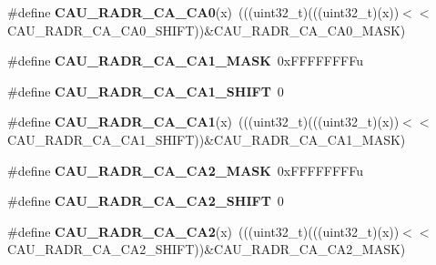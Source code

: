 \begin{DoxyCompactItemize}
\item 
\#define {\bfseries C\+A\+U\+\_\+\+R\+A\+D\+R\+\_\+\+C\+A\+\_\+\+C\+A0}(x)~(((uint32\+\_\+t)(((uint32\+\_\+t)(x))$<$$<$C\+A\+U\+\_\+\+R\+A\+D\+R\+\_\+\+C\+A\+\_\+\+C\+A0\+\_\+\+S\+H\+I\+FT))\&C\+A\+U\+\_\+\+R\+A\+D\+R\+\_\+\+C\+A\+\_\+\+C\+A0\+\_\+\+M\+A\+SK)\hypertarget{group__CAU__Register__Masks_gaf2bb47dc97be73cd0c2862fe138900ec}{}\label{group__CAU__Register__Masks_gaf2bb47dc97be73cd0c2862fe138900ec}

\item 
\#define {\bfseries C\+A\+U\+\_\+\+R\+A\+D\+R\+\_\+\+C\+A\+\_\+\+C\+A1\+\_\+\+M\+A\+SK}~0x\+F\+F\+F\+F\+F\+F\+F\+Fu\hypertarget{group__CAU__Register__Masks_ga7d2e754db6dd6dae2933a852f15a6f60}{}\label{group__CAU__Register__Masks_ga7d2e754db6dd6dae2933a852f15a6f60}

\item 
\#define {\bfseries C\+A\+U\+\_\+\+R\+A\+D\+R\+\_\+\+C\+A\+\_\+\+C\+A1\+\_\+\+S\+H\+I\+FT}~0\hypertarget{group__CAU__Register__Masks_ga1a0bd671ac27226fa5dd3c491a5f74c4}{}\label{group__CAU__Register__Masks_ga1a0bd671ac27226fa5dd3c491a5f74c4}

\item 
\#define {\bfseries C\+A\+U\+\_\+\+R\+A\+D\+R\+\_\+\+C\+A\+\_\+\+C\+A1}(x)~(((uint32\+\_\+t)(((uint32\+\_\+t)(x))$<$$<$C\+A\+U\+\_\+\+R\+A\+D\+R\+\_\+\+C\+A\+\_\+\+C\+A1\+\_\+\+S\+H\+I\+FT))\&C\+A\+U\+\_\+\+R\+A\+D\+R\+\_\+\+C\+A\+\_\+\+C\+A1\+\_\+\+M\+A\+SK)\hypertarget{group__CAU__Register__Masks_ga595e87363fbdaccc16d6c649b1895e6b}{}\label{group__CAU__Register__Masks_ga595e87363fbdaccc16d6c649b1895e6b}

\item 
\#define {\bfseries C\+A\+U\+\_\+\+R\+A\+D\+R\+\_\+\+C\+A\+\_\+\+C\+A2\+\_\+\+M\+A\+SK}~0x\+F\+F\+F\+F\+F\+F\+F\+Fu\hypertarget{group__CAU__Register__Masks_ga7fa186d5e73cc29fa76adb228433030e}{}\label{group__CAU__Register__Masks_ga7fa186d5e73cc29fa76adb228433030e}

\item 
\#define {\bfseries C\+A\+U\+\_\+\+R\+A\+D\+R\+\_\+\+C\+A\+\_\+\+C\+A2\+\_\+\+S\+H\+I\+FT}~0\hypertarget{group__CAU__Register__Masks_gac9854347914cb338851c9a252aca148e}{}\label{group__CAU__Register__Masks_gac9854347914cb338851c9a252aca148e}

\item 
\#define {\bfseries C\+A\+U\+\_\+\+R\+A\+D\+R\+\_\+\+C\+A\+\_\+\+C\+A2}(x)~(((uint32\+\_\+t)(((uint32\+\_\+t)(x))$<$$<$C\+A\+U\+\_\+\+R\+A\+D\+R\+\_\+\+C\+A\+\_\+\+C\+A2\+\_\+\+S\+H\+I\+FT))\&C\+A\+U\+\_\+\+R\+A\+D\+R\+\_\+\+C\+A\+\_\+\+C\+A2\+\_\+\+M\+A\+SK)\hypertarget{group__CAU__Register__Masks_ga3d1fbf4e309510b81c96da1080f52d32}{}\label{group__CAU__Register__Masks_ga3d1fbf4e309510b81c96da1080f52d32}


\end{DoxyCompactItemize}
